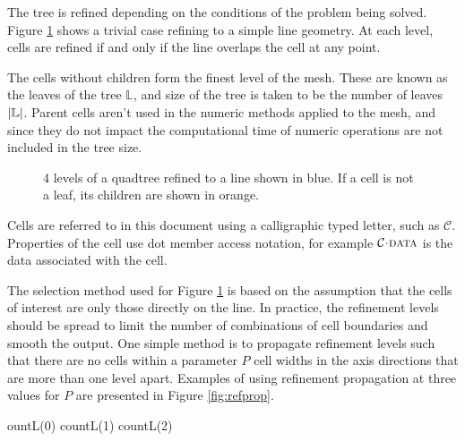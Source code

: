 \documentclass{IIBproject}
\newcommand{\acc}{{\mkern 0.5mu\cdot\mkern 0.5mu}}
\numberwithin{figure}{section}
\begin{document}
        The tree is refined depending on the conditions of the problem being solved. Figure \ref{fig:layeredtree} shows a trivial case refining to a simple line geometry. At each level, cells are refined if and only if the line overlaps the cell at any point. 

        The cells without children form the finest level of the mesh. These are known as the leaves of the tree $\mathbb{L}$, and size of the tree is taken to be the number of leaves $\abs{\mathbb{L}}$. Parent cells aren't used in the numeric methods applied to the mesh, and since they do not impact the computational time of numeric operations are not included in the tree size. 

        \begin{figure} [H]
            
            \caption{4 levels of a quadtree refined to a line shown in blue. If a cell is not a leaf, its children are shown in orange.}
            \label{fig:layeredtree}
        \end{figure}

        Cells are referred to in this document using a calligraphic typed letter, such as $\mathcal{C}$. Properties of the cell use dot member access notation, for example $\mathcal{C}\acc\textproc{data}$ is the data associated with the cell. 

        The selection method used for Figure \ref{fig:layeredtree} is based on the assumption that the cells of interest are only those directly on the line. In practice, the refinement levels should be spread to limit the number of combinations of cell boundaries and smooth the output. One simple method is to propagate refinement levels such that there are no cells within a parameter $P$ cell widths in the axis directions that are more than one level apart. Examples of using refinement propagation at three values for $P$ are presented in Figure \ref{fig:refprop}.

        \expandafter\newcommand\csname countL(0) 
        \expandafter\newcommand\csname countL(1) 
        \expandafter\newcommand\csname countL(2) 
        \newcommand{\getCount} [1]{\csname countL(#1) \endcsname}
\end{document}
